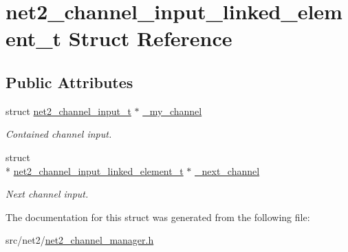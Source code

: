 \hypertarget{structnet2__channel__input__linked__element__t}{\section{net2\-\_\-channel\-\_\-input\-\_\-linked\-\_\-element\-\_\-t Struct Reference}
\label{structnet2__channel__input__linked__element__t}
}
\subsection*{Public Attributes}
\begin{DoxyCompactItemize}
\item 
\hypertarget{structnet2__channel__input__linked__element__t_ad736ec541c37469b5e0e92f1bacc2a62}{struct \hyperlink{structnet2__channel__input__t}{net2\-\_\-channel\-\_\-input\-\_\-t} $\ast$ \hyperlink{structnet2__channel__input__linked__element__t_ad736ec541c37469b5e0e92f1bacc2a62}{\-\_\-my\-\_\-channel}}\label{structnet2__channel__input__linked__element__t_ad736ec541c37469b5e0e92f1bacc2a62}

\begin{DoxyCompactList}\small\item\em Contained channel input. \end{DoxyCompactList}\item 
\hypertarget{structnet2__channel__input__linked__element__t_a1b40af29290880f2edb70e6371ce0a50}{struct \\*
\hyperlink{structnet2__channel__input__linked__element__t}{net2\-\_\-channel\-\_\-input\-\_\-linked\-\_\-element\-\_\-t} $\ast$ \hyperlink{structnet2__channel__input__linked__element__t_a1b40af29290880f2edb70e6371ce0a50}{\-\_\-next\-\_\-channel}}\label{structnet2__channel__input__linked__element__t_a1b40af29290880f2edb70e6371ce0a50}

\begin{DoxyCompactList}\small\item\em Next channel input. \end{DoxyCompactList}\end{DoxyCompactItemize}


The documentation for this struct was generated from the following file\-:\begin{DoxyCompactItemize}
\item 
src/net2/\hyperlink{net2__channel__manager_8h}{net2\-\_\-channel\-\_\-manager.\-h}\end{DoxyCompactItemize}

